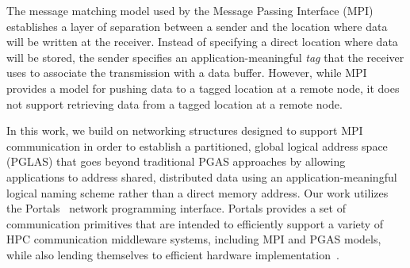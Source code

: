The message matching model used by the Message Passing Interface (MPI)
establishes a layer of separation between a sender and the location where data
will be written at the receiver.  Instead of specifying a direct location where
data will be stored, the sender specifies an application-meaningful {\em tag}
that the receiver uses to associate the transmission with a data buffer.
However, while MPI provides a model for pushing data to a tagged location at a
remote node, it does not support retrieving data from a tagged location at a
remote node.


In this work, we build on networking structures designed to support MPI
communication in order to establish a partitioned, global logical address space
(PGLAS) that goes beyond traditional PGAS approaches by allowing applications
to address shared, distributed data using an application-meaningful logical
naming scheme rather than a direct memory address.  Our work utilizes the
Portals~\cite{portals4} network programming interface.  Portals provides a set
of communication primitives that are intended to efficiently support a variety
of HPC communication middleware systems, including MPI and PGAS models, while
also lending themselves to efficient hardware
implementation~\cite{brightwell:micro:06,bxi}.

%

